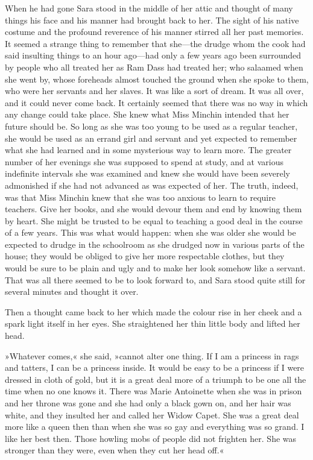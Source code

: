 When he had gone Sara stood in the middle of her attic and thought of many things his face and his manner had brought back to her. The sight of his native costume and the profound reverence of his manner stirred all her past memories. It seemed a strange thing to remember that she—the drudge whom the cook had said insulting things to an hour ago—had only a few years ago been surrounded by people who all treated her as Ram Dass had treated her; who salaamed when she went by, whose foreheads almost touched the ground when she spoke to them, who were her servants and her slaves. It was like a sort of dream. It was all over, and it could never come back. It certainly seemed that there was no way in which any change could take place. She knew what Miss Minchin intended that her future should be. So long as she was too young to be used as a regular teacher, she would be used as an errand girl and servant and yet expected to remember what she had learned and in some mysterious way to learn more. The greater number of her evenings she was supposed to spend at study, and at various indefinite intervals she was examined and knew she would have been severely admonished if she had not advanced as was expected of her. The truth, indeed, was that Miss Minchin knew that she was too anxious to learn to require teachers. Give her books, and she would devour them and end by knowing them by heart. She might be trusted to be equal to teaching a good deal in the course of a few years. This was what would happen: when she was older she would be expected to drudge in the schoolroom as she drudged now in various parts of the house; they would be obliged to give her more respectable clothes, but they would be sure to be plain and ugly and to make her look somehow like a servant. That was all there seemed to be to look forward to, and Sara stood quite still for several minutes and thought it over.

Then a thought came back to her which made the colour rise in her cheek and a spark light itself in her eyes. She straightened her thin little body and lifted her head.

»Whatever comes,« she said, »cannot alter one thing. If I am a princess in rags and tatters, I can be a princess inside. It would be easy to be a princess if I were dressed in cloth of gold, but it is a great deal more of a triumph to be one all the time when no one knows it. There was Marie Antoinette when she was in prison and her throne was gone and she had only a black gown on, and her hair was white, and they insulted her and called her Widow Capet. She was a great deal more like a queen then than when she was so gay and everything was so grand. I like her best then. Those howling mobs of people did not frighten her. She was stronger than they were, even when they cut her head off.«

